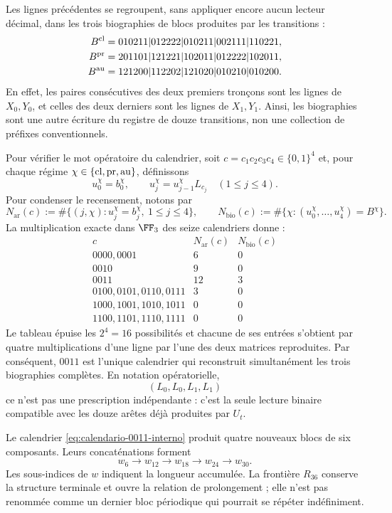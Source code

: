 Les lignes précédentes se regroupent, sans appliquer encore aucun lecteur décimal,
dans les trois biographies de blocs produites par les transitions :
\begin{align}
 B^{\rm cl}
  &=010211|012222|010211|002111|110221,\notag\\
 B^{\rm pr}
  &=201101|121221|102011|012222|102011,
 \label{eq:biografias-tpk-tres-caracteres}\\
 B^{\rm au}
  &=121200|112202|121020|010210|010200.\notag
\end{align}
En effet, les paires consécutives des deux premiers tronçons sont les lignes de \(X_0,Y_0\), et celles des deux derniers sont les lignes de \(X_1,Y_1\). Ainsi, les biographies sont une autre écriture du registre de douze transitions, non une collection de préfixes conventionnels.

Pour vérifier le mot opératoire du calendrier, soit
\(c=c_1c_2c_3c_4\in\{0,1\}^4\) et, pour chaque régime
\(\chi\in\{{\rm cl},{\rm pr},{\rm au}\}\), définissons
\[
 u_0^\chi=b_0^\chi,\qquad
 u_j^\chi=u_{j-1}^\chi L_{c_j}\quad(1\le j\le4).
\]
Pour condenser le recensement, notons par
\[
 N_{\mathrm{ar}}(c):=
 \#\{(j,\chi):u_j^\chi=b_j^\chi,\ 1\le j\le4\},\qquad
 N_{\mathrm{bio}}(c):=
 \#\{\chi:(u_0^\chi,\ldots,u_4^\chi)=B^\chi\}.
\]
La multiplication exacte dans \(\FF_3\) des seize calendriers donne :
\[
\begin{array}{c|c|c}
 c&N_{\mathrm{ar}}(c)&N_{\mathrm{bio}}(c)\\ \hline
0000,0001&6&0\\
0010&9&0\\
0011&12&3\\
0100,0101,0110,0111&3&0\\
1000,1001,1010,1011&0&0\\
1100,1101,1110,1111&0&0
\end{array}
\tag{D}
\label{eq:censo-dieciseis-calendarios}
\]
Le tableau épuise les \(2^4=16\) possibilités et chacune de ses entrées s'obtient
par quatre multiplications d'une ligne par l'une des deux matrices reproduites.
Par conséquent, \(0011\) est l'unique calendrier qui reconstruit
simultanément les trois biographies complètes. En notation opératorielle,
\begin{equation}
 (L_0,L_0,L_1,L_1)
 \label{eq:calendario-0011-interno}
\end{equation}
ce n'est pas une prescription indépendante : c'est la seule lecture binaire compatible
avec les douze arêtes déjà produites par \(U_t\).

Le calendrier \eqref{eq:calendario-0011-interno} produit quatre nouveaux
blocs de six composants. Leurs concaténations forment
\[
 w_6\longrightarrow w_{12}\longrightarrow w_{18}
 \longrightarrow w_{24}\longrightarrow w_{30}.
\]
Les sous-indices de \(w\) indiquent la longueur accumulée. La frontière \(R_{36}\) conserve la structure terminale et ouvre la relation de prolongement ; elle n'est pas renommée comme un dernier bloc périodique qui pourrait se répéter indéfiniment.

